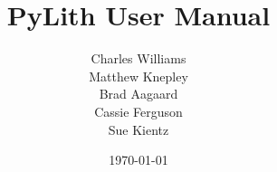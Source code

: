 \documentclass{book}
\begin{document}
\title{PyLith User Manual}
\author{Charles Williams\\
  Matthew Knepley\\
  Brad Aagaard\\
  Cassie Ferguson\\
  Sue Kientz}
\date{\today}
 
\maketitle

\frontmatter



\mainmatter






\appendix



\end{document}
